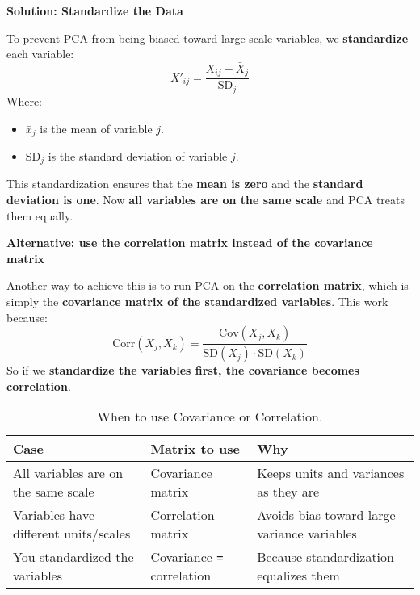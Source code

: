 \highspace
\begin{flushleft}
    \textcolor{Green3}{ \textbf{Solution: Standardize the Data}}
\end{flushleft}
To prevent PCA from being biased toward large-scale variables, we \textbf{standardize} each variable:
\begin{equation}
    X'_{ij} = \frac{X_{ij} - \bar{X}_{j}}{\text{SD}_{j}}
\end{equation}
Where:
\begin{itemize}
    \item $\bar{x}_{j}$ is the mean of variable $j$.
    \item $\text{SD}_{j}$ is the standard deviation of variable $j$.
\end{itemize}
This standardization ensures that the \textbf{mean is zero} and the \textbf{standard deviation is one}. Now \textbf{all variables are on the same scale} and PCA treats them equally.

\newpage

\begin{flushleft}
    \textcolor{Green3}{ \textbf{Alternative: use the correlation matrix instead of the covariance matrix}}
\end{flushleft}
Another way to achieve this is to run PCA on the \textbf{correlation matrix}, which is simply the \textbf{covariance matrix of the standardized variables}. This work because:
\begin{equation}
    \text{Corr}(X_{j}, X_{k}) = \dfrac{\text{Cov}(X_{j}, X_{k})}{\text{SD}\left(X_{j}\right) \cdot \text{SD}\left(X_{k}\right)}
\end{equation}
So if we \textbf{standardize the variables first, the covariance becomes correlation}.

\highspace
\begin{table}[!htp]
    \centering
    \begin{adjustbox}{width={\textwidth},totalheight={\textheight},keepaspectratio}
        \begin{tabular}{@{} l | l | l @{}}
            \toprule
            \textbf{Case}                           & \textbf{Matrix to use}              & \textbf{Why} \\
            \midrule
            All variables are on the same scale     & Covariance matrix                   & Keeps units and variances as they are \\ [.3em]
            Variables have different units/scales   & Correlation matrix                  & Avoids bias toward large-variance variables \\ [.3em]
            You standardized the variables          & Covariance \texttt{=} correlation   & Because standardization equalizes them \\
            \bottomrule
        \end{tabular}
    \end{adjustbox}
    \caption{When to use Covariance or Correlation.}
\end{table}